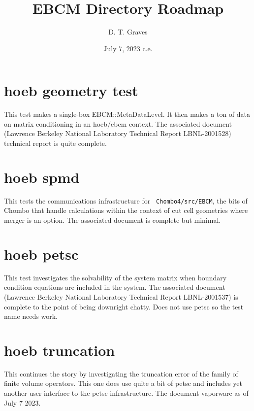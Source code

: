 \documentclass{article}
\begin{document}
\title{EBCM Directory Roadmap}
\author{ D. T. Graves }
\date{July 7, 2023 c.e.}
\maketitle

\section{hoeb geometry test}

This test makes a single-box EBCM::MetaDataLevel.  It then makes a ton
of data on matrix conditioning in an hoeb/ebcm context.    The
associated document (Lawrence Berkeley National Laboratory
Technical Report LBNL-2001528)
technical report is quite complete.   

\section{hoeb spmd}

This tests the communications infrastructure for {\tt
Chombo4/src/EBCM}, the bits of Chombo that handle calculations
within the context of  cut cell geometries where merger is an option.
The associated document is complete but minimal.


\section{hoeb petsc}

This test investigates the solvability of the system matrix when
boundary condition equations are included in the system.
The associated document
(Lawrence Berkeley National Laboratory
Technical Report LBNL-2001537)
is complete to the point of being downright
chatty. Does not use petsc so the test name needs work.

\section{hoeb truncation}

This continues the story by investigating the truncation error of
the family of finite volume operators.   This one does use quite a bit
of petsc and includes yet another user interface to the petsc
infrastructure.   The document vaporware as of July 7 2023.
\end{document}
